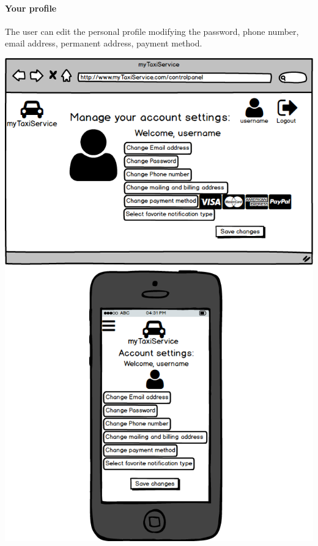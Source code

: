 \documentclass[a4paper,11pt]{report} %
\begin{document}
	\paragraph{Your profile} The user can edit the personal profile modifying the password, phone number, email address, permanent address, payment method.
	\begin{center}
		\includegraphics[width=0.9\linewidth]{Pictures/AccountPage}
	\end{center}
	\pagebreak
	
\end{document}
